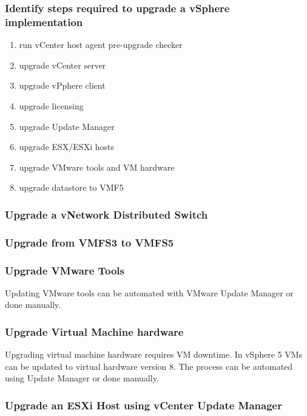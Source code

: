 \subsubsection{Identify steps required to upgrade a vSphere implementation}

\begin{enumerate}
\item run vCenter host agent pre-upgrade checker
\item upgrade vCenter server
\item upgrade vPphere client
\item upgrade licensing
\item upgrade Update Manager
\item upgrade ESX/ESXi hosts
\item upgrade VMware tools and VM hardware
\item upgrade datastore to VMF5
\end{enumerate}

\subsubsection{Upgrade a vNetwork Distributed Switch}

\subsubsection{Upgrade from VMFS3 to VMFS5}

\subsubsection{Upgrade VMware Tools}

Updating VMware tools can be automated with VMware Update Manager or done
manually.

\subsubsection{Upgrade Virtual Machine hardware}

Upgrading virtual machine hardware requires VM downtime. In vSphere 5 VMs
can be updated to virtual hardware version 8. The process can be automated
using Update Manager or done manually.

\subsubsection{Upgrade an ESXi Host using vCenter Update Manager}

